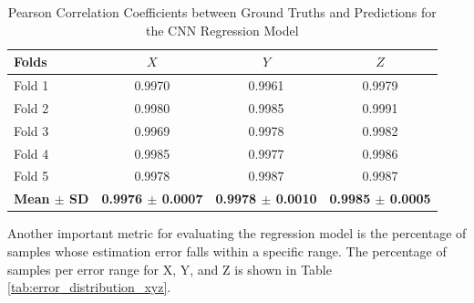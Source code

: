 \begin{table}[htbp]
  \centering
  \caption{Pearson Correlation Coefficients between Ground Truths and Predictions for the CNN Regression Model}
  \label{tab:pearson_corr_xyz}
  \vspace{0.25cm}
  \begin{tabular}{lccc}
    \toprule
    \textbf{Folds} & \textbf{$X$} & \textbf{$Y$} & \textbf{$Z$} \\
    \midrule
    Fold 1 & 0.9970 & 0.9961 & 0.9979 \\
    Fold 2 & 0.9980 & 0.9985 & 0.9991 \\
    Fold 3 & 0.9969 & 0.9978 & 0.9982 \\
    Fold 4 & 0.9985 & 0.9977 & 0.9986 \\
    Fold 5 & 0.9978 & 0.9987 & 0.9987 \\
    \midrule
    \textbf{Mean $\pm$ SD} & \textbf{0.9976 $\pm$ 0.0007} & \textbf{0.9978 $\pm$ 0.0010} & \textbf{0.9985 $\pm$ 0.0005} \\
    \bottomrule
  \end{tabular}
\end{table}


Another important metric for evaluating the regression model is the percentage of samples whose estimation error falls within a specific range. The percentage of samples per error range for X, Y, and Z is shown in Table \ref{tab:error_distribution_xyz}.  

